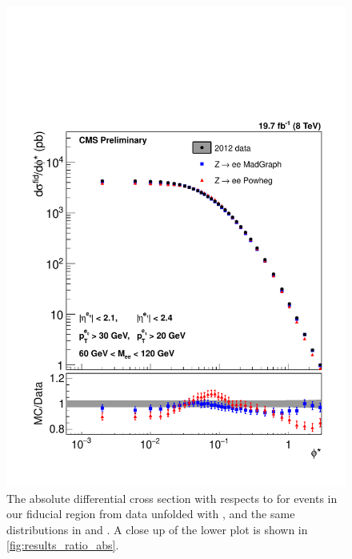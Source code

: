 \begin{figure}[!p]
    \centering
    \includegraphics[width=\textwidth]{figures/ZShape_elec_Abs_Dressed.pdf}
    \caption[
        The absolute differential cross section with respects to \phistar for
        \Ztoee events in our fiducial region from data unfolded with \MADGRAPH.
    ]{
        The absolute differential cross section with respects to \phistar for
        \Ztoee events in our fiducial region from data unfolded with \MADGRAPH,
        and the same distributions in \MADGRAPH and \PPsixZtwo. A close up of
        the lower plot is shown in \cref{fig:results_ratio_abs}.
    }
    \label{fig:results_abs}
\end{figure}

